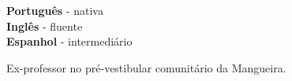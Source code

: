 \documentclass[9pt]{developercv} %
\begin{document}

\begin{minipage}[t]{0.3\textwidth}
	\vspace{-\baselineskip} %

	
	\textbf{Português} - nativa\\
	\textbf{Inglês} - fluente\\
	\textbf{Espanhol} - intermediário
\end{minipage}
\hfill
\begin{minipage}[t]{0.3\textwidth}
	\vspace{-\baselineskip} %
	
	
	Ex-professor no pré-vestibular comunitário da Mangueira.
\end{minipage}

\end{document}
